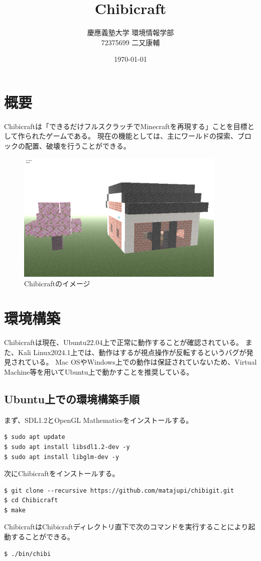\documentclass[dvipdfmx]{jsarticle}
\title{Chibicraft}
\author{
    慶應義塾大学 環境情報学部 \\
    72375699 二又康輔
}
\date{\today}
\begin{document}
\maketitle

\section{概要}
Chibicraftは「できるだけフルスクラッチでMinecraftを再現する」ことを目標として作られたゲームである。
現在の機能としては、主にワールドの探索、ブロックの配置、破壊を行うことができる。

\begin{figure}[H]
    \begin{center}
        \includegraphics[width=100mm]{chibi.png}
        \caption{Chibicraftのイメージ}
    \end{center}
\end{figure}

\section{環境構築}
Chibicraftは現在、Ubuntu22.04上で正常に動作することが確認されている。
また、Kali Linux2024.1上では、動作はするが視点操作が反転するというバグが発見されている。
Mac OSやWindows上での動作は保証されていないため、Virtual Machine等を用いてUbuntu上で動かすことを推奨している。

\subsection{Ubuntu上での環境構築手順}
まず、SDL1.2とOpenGL Mathematicsをインストールする。
\begin{lstlisting}
$ sudo apt update
$ sudo apt install libsdl1.2-dev -y
$ sudo apt install libglm-dev -y
\end{lstlisting}
次にChibicraftをインストールする。
\begin{lstlisting}
$ git clone --recursive https://github.com/matajupi/chibigit.git
$ cd Chibicraft
$ make
\end{lstlisting}
ChibicraftはChibicraftディレクトリ直下で次のコマンドを実行することにより起動することができる。
\begin{lstlisting}
$ ./bin/chibi
\end{lstlisting}
\end{document}
